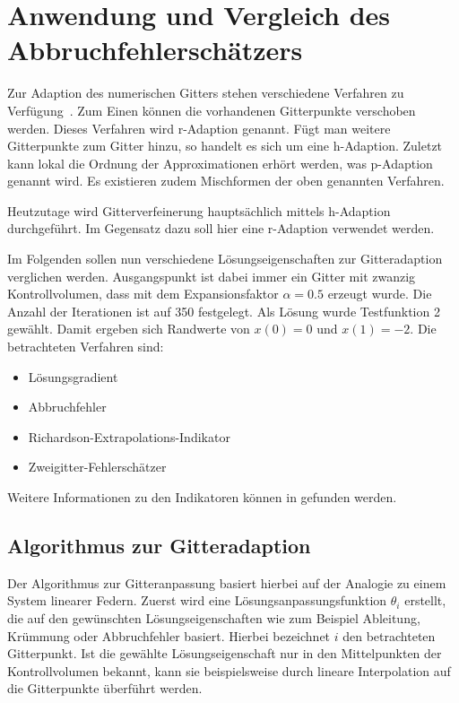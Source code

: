 \chapter{Anwendung und Vergleich des Abbruchfehlerschätzers}

Zur Adaption des numerischen Gitters stehen verschiedene Verfahren zu Verfügung~\cite{roy2}.
Zum Einen können die vorhandenen Gitterpunkte verschoben werden. Dieses Verfahren wird r-Adaption
genannt. Fügt man weitere Gitterpunkte zum Gitter hinzu, so handelt es sich um eine h-Adaption.
Zuletzt kann lokal die Ordnung der Approximationen erhört werden, was p-Adaption genannt wird.
Es existieren zudem Mischformen der oben genannten Verfahren.

Heutzutage wird Gitterverfeinerung hauptsächlich mittels h-Adaption durchgeführt. Im Gegensatz dazu
soll hier eine r-Adaption verwendet werden.

Im Folgenden sollen nun verschiedene Lösungseigenschaften zur Gitteradaption verglichen werden.
Ausgangspunkt ist dabei immer ein Gitter mit zwanzig Kontrollvolumen, dass mit dem
Expansionsfaktor $\alpha=0.5$ erzeugt wurde. Die Anzahl der Iterationen ist auf 350 festgelegt.
Als Lösung wurde Testfunktion 2 gewählt. Damit ergeben sich Randwerte von $x(0)=0$ und $x(1)=-2$.
Die betrachteten Verfahren sind:
\begin{itemize}
  \item Lösungsgradient
  \item Abbruchfehler
  \item Richardson-Extrapolations-Indikator
  \item Zweigitter-Fehlerschätzer
\end{itemize}
Weitere Informationen zu den Indikatoren können in \cite{celik} gefunden werden.




\section{Algorithmus zur Gitteradaption}

Der Algorithmus zur Gitteranpassung basiert hierbei auf der Analogie zu einem System
linearer Federn.
Zuerst wird eine Lösungsanpassungsfunktion $\theta_i$ erstellt, die auf den gewünschten
Lösungseigenschaften wie zum Beispiel Ableitung, Krümmung oder Abbruchfehler basiert. Hierbei
bezeichnet $i$ den betrachteten Gitterpunkt. Ist die gewählte Lösungseigenschaft nur in den
Mittelpunkten der Kontrollvolumen bekannt, kann sie beispielsweise durch lineare Interpolation
auf die Gitterpunkte überführt werden.

